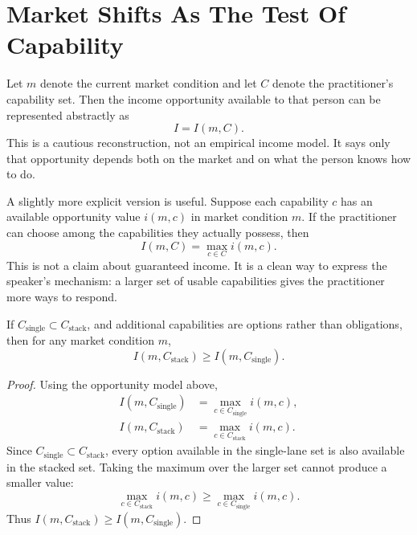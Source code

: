 \section{Market Shifts As The Test Of Capability}

Let \(m\) denote the current market condition and let \(C\) denote the practitioner's capability set. Then the income opportunity available to that person can be represented abstractly as
\begin{equation}
I = I(m,C).
\end{equation}
This is a cautious reconstruction, not an empirical income model. It says only that opportunity depends both on the market and on what the person knows how to do.

A slightly more explicit version is useful. Suppose each capability \(c\) has an available opportunity value \(i(m,c)\) in market condition \(m\). If the practitioner can choose among the capabilities they actually possess, then
\begin{equation}
I(m,C)=\max_{c\in C} i(m,c).
\end{equation}
This is not a claim about guaranteed income. It is a clean way to express the speaker's mechanism: a larger set of usable capabilities gives the practitioner more ways to respond.

\begin{proposition}
If \(C_{\text{single}}\subset C_{\text{stack}}\), and additional capabilities are options rather than obligations, then for any market condition \(m\),
\begin{equation}
I(m,C_{\text{stack}})\geq I(m,C_{\text{single}}).
\end{equation}
\end{proposition}

\begin{proof}
Using the opportunity model above,
\begin{align}
I(m,C_{\text{single}})
&=
\max_{c\in C_{\text{single}}} i(m,c),\\
I(m,C_{\text{stack}})
&=
\max_{c\in C_{\text{stack}}} i(m,c).
\end{align}
Since \(C_{\text{single}}\subset C_{\text{stack}}\), every option available in the single-lane set is also available in the stacked set. Taking the maximum over the larger set cannot produce a smaller value:
\begin{equation}
\max_{c\in C_{\text{stack}}} i(m,c)
\geq
\max_{c\in C_{\text{single}}} i(m,c).
\end{equation}
Thus \(I(m,C_{\text{stack}})\geq I(m,C_{\text{single}})\).
\end{proof}

